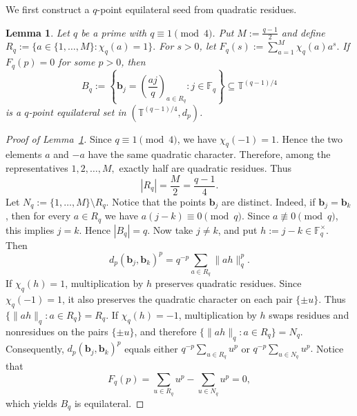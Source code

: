 \documentclass[11pt]{article}
\newtheorem{lemma}[theorem]{Lemma}
\theoremstyle{definition}
\newcommand{\F}{\mathbb{F}}
\newcommand{\T}{\mathbb T}
\begin{document}
We first construct a \(q\)-point
equilateral seed from quadratic residues.
\begin{lemma}\label{lem:quadratic-seed}
Let \(q\) be a prime with \(q\equiv 1\pmod 4\). Put
\(
M:=\frac{q-1}{2}
\)
and define
\(
R_q:=\{a\in\{1,\dots,M\}:\chi_q(a)=1\}.
\)
For \(s>0\), let
\(
F_q(s):=\sum_{a=1}^{M}\chi_q(a)a^s.
\)
If \(F_q(p)=0\) for some \(p>0\), then
\[
B_q:=
\left\{
\boldsymbol{
b}_j=\left(\frac{aj}{q}\right)_{a\in R_q}:j\in\F_q
\right\}
\subseteq \T^{(q-1)/4}
\]
is a \(q\)-point equilateral set in \((\T^{(q-1)/4},d_p)\).
\end{lemma}
\begin{proof}[Proof of Lemma~\ref{lem:quadratic-seed}]
    Since \(q\equiv1\pmod4\), we have \(\chi_q(-1)=1\). Hence the two elements
\(a\) and \(-a\) have the same quadratic character. Therefore, among the
representatives
\(
1,2,\dots,M,
\)
exactly half are quadratic residues. Thus
\[
|R_q|=\frac{M}{2}=\frac{q-1}{4}.
\]
Let
\(
N_q:=\{1,\dots,M\}\setminus R_q.
\)
Notice that the points \(\boldsymbol{b}_j\) are distinct. Indeed, if \(\boldsymbol{b}_j=\boldsymbol{b}_k\), then
for every \(a\in R_q\) we have \(a(j-k)\equiv0\pmod q\). Since \(a\not\equiv0\pmod q\),
this implies \(j=k\). Hence \(|B_q|=q\). Now take \(j\neq k\), and put
\(
h:=j-k\in\F_q^\times.
\)
Then
\[
d_p(\boldsymbol{b}_j,\boldsymbol{b}_k)^p
=
q^{-p}\sum_{a\in R_q}\|ah\|_q^p.
\]
If \(\chi_q(h)=1\), multiplication by \(h\) preserves quadratic residues. Since
\(\chi_q(-1)=1\), it also preserves the quadratic character on each pair
\(\{\pm u\}\). Thus
\(
\{\|ah\|_q:a\in R_q\}=R_q.
\)
If \(\chi_q(h)=-1\), multiplication by \(h\) swaps residues and nonresidues on
the pairs \(\{\pm u\}\), and therefore
\(
\{\|ah\|_q:a\in R_q\}=N_q.
\)
Consequently,
\(
d_p(\boldsymbol{b}_j,\boldsymbol{b}_k)^p\) equals either \(
q^{-p}\sum_{u\in R_q}u^p\) or
\(
q^{-p}\sum_{u\in N_q}u^p.
\)
Notice that
\[
F_q(p)
=
\sum_{u\in R_q}u^p-\sum_{u\in N_q}u^p=0,
\]
which yields \(B_{q}\) is equilateral.
\end{proof}
\end{document}
